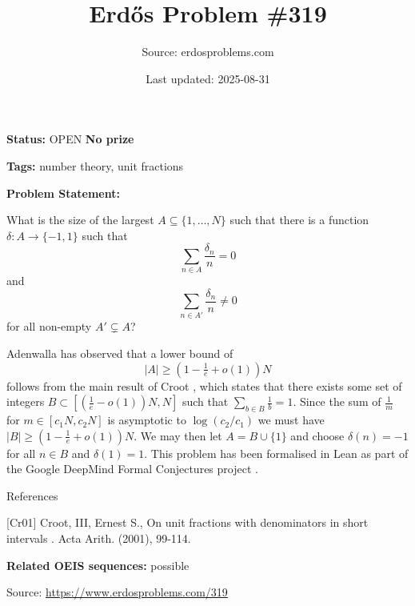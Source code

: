 \documentclass{article}
\title{Erd\H{o}s Problem \#319}
\date{Last updated: 2025-08-31}
\author{Source: erdosproblems.com}
\begin{document}
\maketitle

\noindent\textbf{Status:} OPEN \quad \textbf{No prize}

\noindent\textbf{Tags:} number theory, unit fractions

\medskip

\noindent\textbf{Problem Statement:}

What is the size of the largest $A\subseteq \{1,\ldots,N\}$ such that there is a function $\delta:A\to \{-1,1\}$ such that\[\sum_{n\in A}\frac{\delta_n}{n}=0\]and\[\sum_{n\in A'}\frac{\delta_n}{n}\neq 0\]for all non-empty $A'\subsetneq A$?




Adenwalla has observed that a lower bound of\[\lvert A\rvert\geq (1-\tfrac{1}{e}+o(1))N\]follows from the main result of Croot \cite{Cr01}, which states that there exists some set of integers $B\subset [(\frac{1}{e}-o(1))N,N]$ such that $\sum_{b\in B}\frac{1}{b}=1$. Since the sum of $\frac{1}{m}$ for $m\in [c_1N,c_2N]$ is asymptotic to $\log(c_2/c_1)$ we must have $\lvert B\rvert \geq (1-\tfrac{1}{e}+o(1))N$. We may then let $A=B\cup\{1\}$ and choose $\delta(n)=-1$ for all $n\in B$ and $\delta(1)=1$. This problem has been formalised in Lean as part of the Google DeepMind Formal Conjectures project .




References

[Cr01] Croot, III, Ernest S., On unit fractions with denominators in short intervals . Acta Arith. (2001), 99-114.

\noindent\textbf{Related OEIS sequences:} possible


\bigskip
\noindent\small{Source: \url{https://www.erdosproblems.com/319}}
\end{document}
